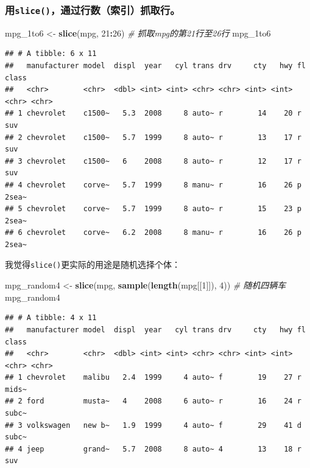 \documentclass[]{book}
\newenvironment{Shaded}{\begin{snugshade}}{\end{snugshade}}
\newcommand{\CommentTok}[1]{\textcolor[rgb]{0.56,0.35,0.01}{\textit{#1}}}
\newcommand{\DecValTok}[1]{\textcolor[rgb]{0.00,0.00,0.81}{#1}}
\newcommand{\KeywordTok}[1]{\textcolor[rgb]{0.13,0.29,0.53}{\textbf{#1}}}
\newcommand{\NormalTok}[1]{#1}
\newcommand{\OperatorTok}[1]{\textcolor[rgb]{0.81,0.36,0.00}{\textbf{#1}}}
\newcommand{\StringTok}[1]{\textcolor[rgb]{0.31,0.60,0.02}{#1}}
\begin{document}
\hypertarget{slice}{%
\subsubsection{\texorpdfstring{用\texttt{slice()}，通过行数（索引）抓取行。}{用slice()，通过行数（索引）抓取行。}}\label{slice}}

\begin{Shaded}
\begin{Highlighting}[]
\NormalTok{mpg_1to6 <-}\StringTok{ }\KeywordTok{slice}\NormalTok{(mpg, }\DecValTok{21}\OperatorTok{:}\DecValTok{26}\NormalTok{) }\CommentTok{# 抓取mpg的第21行至26行}
\NormalTok{mpg_1to6}
\end{Highlighting}
\end{Shaded}

\begin{verbatim}
## # A tibble: 6 x 11
##   manufacturer model  displ  year   cyl trans drv     cty   hwy fl    class
##   <chr>        <chr>  <dbl> <int> <int> <chr> <chr> <int> <int> <chr> <chr>
## 1 chevrolet    c1500~   5.3  2008     8 auto~ r        14    20 r     suv  
## 2 chevrolet    c1500~   5.7  1999     8 auto~ r        13    17 r     suv  
## 3 chevrolet    c1500~   6    2008     8 auto~ r        12    17 r     suv  
## 4 chevrolet    corve~   5.7  1999     8 manu~ r        16    26 p     2sea~
## 5 chevrolet    corve~   5.7  1999     8 auto~ r        15    23 p     2sea~
## 6 chevrolet    corve~   6.2  2008     8 manu~ r        16    26 p     2sea~
\end{verbatim}

我觉得\texttt{slice()}更实际的用途是随机选择个体：

\begin{Shaded}
\begin{Highlighting}[]
\NormalTok{mpg_random4 <-}\StringTok{ }\KeywordTok{slice}\NormalTok{(mpg, }\KeywordTok{sample}\NormalTok{(}\KeywordTok{length}\NormalTok{(mpg[[}\DecValTok{1}\NormalTok{]]), }\DecValTok{4}\NormalTok{)) }\CommentTok{# 随机四辆车}
\NormalTok{mpg_random4}
\end{Highlighting}
\end{Shaded}

\begin{verbatim}
## # A tibble: 4 x 11
##   manufacturer model  displ  year   cyl trans drv     cty   hwy fl    class
##   <chr>        <chr>  <dbl> <int> <int> <chr> <chr> <int> <int> <chr> <chr>
## 1 chevrolet    malibu   2.4  1999     4 auto~ f        19    27 r     mids~
## 2 ford         musta~   4    2008     6 auto~ r        16    24 r     subc~
## 3 volkswagen   new b~   1.9  1999     4 auto~ f        29    41 d     subc~
## 4 jeep         grand~   5.7  2008     8 auto~ 4        13    18 r     suv
\end{verbatim}
\end{document}
